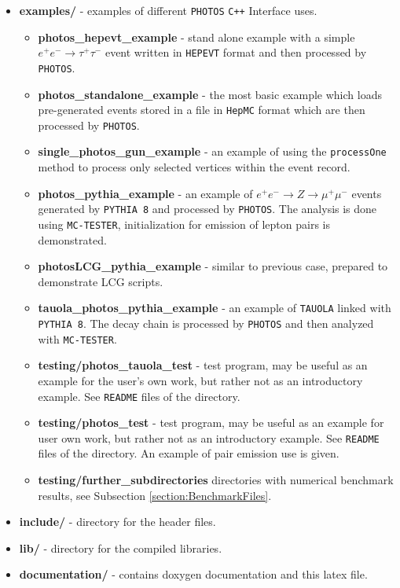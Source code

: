\documentclass[]{Photos_interface_design}
\begin{document}
\begin{itemize}
  \item {\bf examples/ } - examples of different {\tt PHOTOS} {\tt C++} Interface uses.
    \begin{itemize}
        \item {\bf photos\_hepevt\_example} - stand alone example with a simple 
        $e^+e^- \rightarrow \tau^+\tau^-$ event written in {\tt HEPEVT} format
         and then processed by {\tt PHOTOS}.
	\item {\bf photos\_standalone\_example} - the most basic example which loads pre-generated 
	      events stored in a file in {\tt HepMC} format which are then processed by {\tt PHOTOS}.
	\item {\bf single\_photos\_gun\_example} - an example of using the {\tt processOne} method
	      to process only selected vertices within the event record.
    \item {\bf photos\_pythia\_example} - an example of $e^+e^- \rightarrow Z \rightarrow \mu^+\mu^-$ events
	generated by {\tt PYTHIA 8} and processed by {\tt PHOTOS}. The analysis is done using {\tt MC-TESTER}, initialization for emission of lepton pairs
is demonstrated.
   \item {\bf photosLCG\_pythia\_example} - similar to previous case, prepared
to demonstrate LCG scripts.
    \item {\bf tauola\_photos\_pythia\_example } - an example of  {\tt TAUOLA} linked with {\tt PYTHIA 8}.
	The decay chain is processed by {\tt PHOTOS} and then analyzed with {\tt MC-TESTER}.
\item {\bf testing/photos\_tauola\_test} - test program, may be useful as an example for the user's own work, but rather not as an introductory example. See {\tt README} files of the directory. 
\item {\bf testing/photos\_test} - test program, may be useful as an example for user own work, but rather not as an introductory example. See {\tt README} files of the directory. An example of pair emission use is given.
\item {\bf testing/further\_subdirectories} directories with numerical benchmark results, see Subsection \ref{section:BenchmarkFiles}.
    \end{itemize}   
  \item {\bf include/} - directory for the header files.
  \item {\bf lib/ } - directory for the compiled  libraries. 
  \item {\bf documentation/ } - contains doxygen documentation and this latex file.
\end{itemize}
\end{document}
